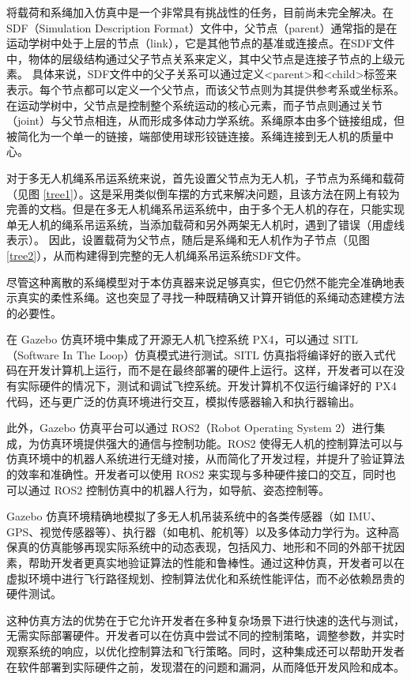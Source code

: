 \documentclass[lang=chs, degree=master, blindreview=true, winfonts=true]{yanputhesis}
\begin{document}
将载荷和系绳加入仿真中是一个非常具有挑战性的任务，目前尚未完全解决。在SDF（Simulation Description Format）文件中，父节点（parent）通常指的是在运动学树中处于上层的节点（link），它是其他节点的基准或连接点。在SDF文件中，物体的层级结构通过父子节点关系来定义，其中父节点是连接子节点的上级元素。
具体来说，SDF文件中的父子关系可以通过定义<parent>和<child>标签来表示。每个节点都可以定义一个父节点，而该父节点则为其提供参考系或坐标系。在运动学树中，父节点是控制整个系统运动的核心元素，而子节点则通过关节（joint）与父节点相连，从而形成多体动力学系统。系绳原本由多个链接组成，但被简化为一个单一的链接，端部使用球形铰链连接。系绳连接到无人机的质量中心。

对于多无人机绳系吊运系统来说，首先设置父节点为无人机，子节点为系绳和载荷（见图 \ref{tree1}）。这是采用类似倒车摆的方式来解决问题，且该方法在网上有较为完善的文档。但是在多无人机绳系吊运系统中，由于多个无人机的存在，只能实现单无人机的绳系吊运系统，当添加载荷和另外两架无人机时，遇到了错误（用虚线表示）。
因此，设置载荷为父节点，随后是系绳和无人机作为子节点（见图 \ref{tree2}），从而构建得到完整的无人机绳系吊运系统SDF文件。

尽管这种离散的系绳模型对于本仿真器来说足够真实，但它仍然不能完全准确地表示真实的柔性系绳。这也突显了寻找一种既精确又计算开销低的系绳动态建模方法的必要性。

在 Gazebo 仿真环境中集成了开源无人机飞控系统 PX4，可以通过 SITL（Software In The Loop）仿真模式进行测试。SITL 仿真指将编译好的嵌入式代码在开发计算机上运行，而不是在最终部署的硬件上运行。这样，开发者可以在没有实际硬件的情况下，测试和调试飞控系统。开发计算机不仅运行编译好的 PX4 代码，还与更广泛的仿真环境进行交互，模拟传感器输入和执行器输出。

此外，Gazebo 仿真平台可以通过 ROS2（Robot Operating System 2）进行集成，为仿真环境提供强大的通信与控制功能。ROS2 使得无人机的控制算法可以与仿真环境中的机器人系统进行无缝对接，从而简化了开发过程，并提升了验证算法的效率和准确性。开发者可以使用 ROS2 来实现与多种硬件接口的交互，同时也可以通过 ROS2 控制仿真中的机器人行为，如导航、姿态控制等。

Gazebo 仿真环境精确地模拟了多无人机吊装系统中的各类传感器（如 IMU、GPS、视觉传感器等）、执行器（如电机、舵机等）以及多体动力学行为。这种高保真的仿真能够再现实际系统中的动态表现，包括风力、地形和不同的外部干扰因素，帮助开发者更真实地验证算法的性能和鲁棒性。通过这种仿真，开发者可以在虚拟环境中进行飞行路径规划、控制算法优化和系统性能评估，而不必依赖昂贵的硬件测试。

这种仿真方法的优势在于它允许开发者在多种复杂场景下进行快速的迭代与测试，无需实际部署硬件。开发者可以在仿真中尝试不同的控制策略，调整参数，并实时观察系统的响应，以优化控制算法和飞行策略。同时，这种集成还可以帮助开发者在软件部署到实际硬件之前，发现潜在的问题和漏洞，从而降低开发风险和成本。
\end{document}
